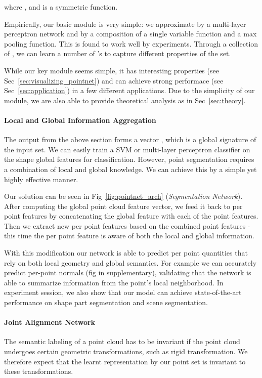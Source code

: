 \documentclass[10pt,twocolumn,letterpaper]{article}
\begin{document}
where ,  and  is a symmetric function.

Empirically, our basic module is very simple: we approximate  by a multi-layer perceptron network and  by a composition of a single variable function and a max pooling function. This is found to work well by experiments. Through a collection of , we can learn a number of 's to capture different properties of the set. 

While our key module seems simple, it has interesting properties (see Sec~\ref{sec:visualizing_pointnet}) and can achieve strong performace (see Sec~\ref{sec:application}) in a few different applications. Due to the simplicity of our module, we are also able to provide theoretical analysis as in Sec~\ref{sec:theory}.


\paragraph{Local and Global Information Aggregation}
The output from the above section forms a vector , which is a global signature of the input set. We can easily train a SVM or multi-layer perceptron classifier on the shape global features for classification. However, point segmentation requires a combination of local and global knowledge. We can achieve this by a simple yet highly effective manner. 

Our solution can be seen in Fig~\ref{fig:pointnet_arch} (\textit{Segmentation Network}). After computing the global point cloud feature vector, we feed it back to per point features by concatenating the global feature with each of the point features. Then we extract new per point features based on the combined point features - this time the per point feature is aware of both the local and global information. 

With this modification our network is able to predict per point quantities that rely on both local geometry and global semantics. For example we can accurately predict per-point normals (fig in supplementary), validating that the network is able to summarize information from the point's local neighborhood. In experiment session, we also show that our model can achieve state-of-the-art performance on shape part segmentation and scene segmentation.
    
\paragraph{Joint Alignment Network}
The semantic labeling of a point cloud has to be invariant if the point cloud undergoes certain geometric transformations, such as rigid transformation. We therefore expect that the learnt representation by our point set is invariant to these transformations. 
\end{document}

